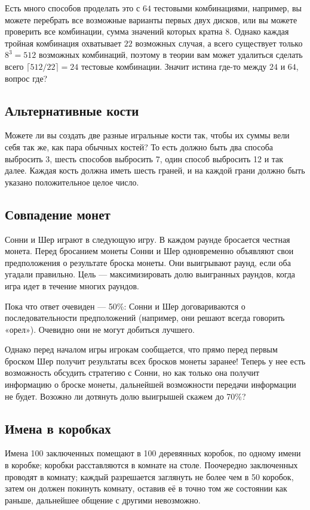 Есть много способов проделать это с $64$ тестовыми комбинациями, например, вы можете перебрать все возможные варианты первых двух дисков, или вы можете проверить все комбинации, сумма значений которых кратна 8.
Однако каждая тройная комбинация охватывает $22$ возможных случая, а всего существует только $8^3 = 512$ возможных комбинаций, поэтому в теории вам может удалиться сделать всего $\lceil 512/22 \rceil = 24$ тестовые комбинации.
Значит истина где-то между $24$ и $64$, вопрос где?

\subsection*{Альтернативные кости}

Можете ли вы создать две разные игральные кости так, чтобы их суммы вели себя так же, как пара обычных костей?
То есть должно быть два способа выбросить 3, шесть способов выбросить 7, один способ выбросить 12 и так далее. Каждая кость должна иметь шесть граней, и на каждой грани должно быть указано положительное целое число.

\subsection*{Совпадение монет}

Сонни и Шер играют в следующую игру.
В каждом раунде бросается честная монета.
Перед бросанием монеты Сонни и Шер одновременно объявляют свои предположения о результате броска монеты.
Они выигрывают раунд, если оба угадали правильно.
Цель --- максимизировать долю выигранных раундов, когда игра идет в течение многих раундов.

Пока что ответ очевиден --- 50\%: Сонни и Шер договариваются о последовательности предположений (например, они решают всегда говорить «орел»).
Очевидно они не могут добиться лучшего.

Однако перед началом игры игрокам сообщается, что прямо перед первым броском Шер получит результаты всех бросков монеты заранее!
Теперь у нее есть возможность обсудить стратегию с Сонни, но как только она получит информацию о броске монеты, дальнейшей возможности передачи информации не будет.
Возожно ли дотянуть долю выигрышей скажем до 70\%?

\subsection*{Имена в коробках}

Имена 100 заключенных помещают в 100 деревянных коробок, по одному имени в коробке;
коробки расставляются в комнате на столе.
Поочередно заключенных проводят в комнату;
каждый разрешается заглянуть не более чем в 50 коробок,
затем он должен покинуть комнату, оставив её в точно том же состоянии как раньше,
дальнейшее общение с другими невозможно.

